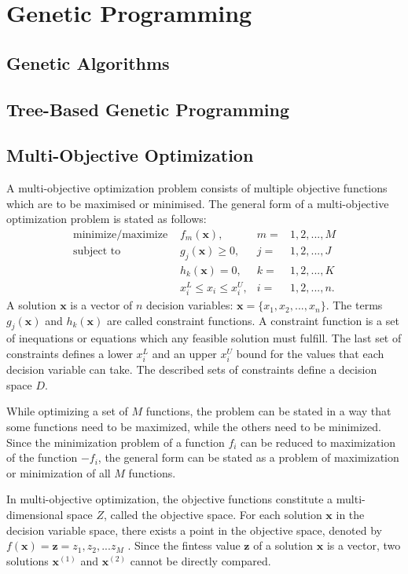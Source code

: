 \chapter{Genetic Programming}
\section{Genetic Algorithms}
\section{Tree-Based Genetic Programming}

\section{Multi-Objective Optimization}
A multi-objective optimization problem consists of multiple objective functions which are to be maximised or minimised. 
The general form of a multi-objective optimization problem is stated as follows:
\begin{align*}
\text{minimize/maximize } & f_m(\textbf{x}),  & m = & 1, 2, ..., M \\
\text{subject to } & g_j(\textbf{x}) \geq 0, & j = & 1, 2, ..., J \\
           & h_k(\textbf{x}) = 0, & k = & 1, 2, ..., K \\
           & x_{i}^{L} \leq x_i \leq x_{i}^{U}, & i = & 1, 2, ..., n. 
\end{align*}
A solution $\textbf{x}$ is a vector of $n$ decision variables: $\textbf{x} = \{x_1,x_2,...,x_n\}$.
The terms $g_j(\textbf{x})$ and $h_k(\textbf{x})$ are called constraint functions. 
A constraint function is a set of inequations or equations which any feasible solution must fulfill. 
The last set of constraints defines a lower $x_{i}^{L}$ and an upper $x_{i}^{U}$ bound for the values that each decision variable can take. 
The described sets of constraints define a decision space $D$.

While optimizing a set of $M$ functions, the problem can be stated in a way that some functions need to be maximized, while the others need to be minimized. 
Since the minimization problem of a function $f_i$ can be reduced to maximization of the function $-f_i$, the general form can be stated as a problem of maximization or minimization of all $M$ functions.

In multi-objective optimization, the objective functions constitute a multi-dimensional space $Z$, called the objective space. 
For each solution $\textbf{x}$ in the decision variable space, there exists a point in the objective space, denoted by $f(\textbf{x}) = \textbf{z} = {z_1, z_2, ... z_M}$ 
\cite{deb2001multi}. 
Since the fintess value $\textbf{z}$ of a solution $\textbf{x}$ is a vector, two solutions 
$\textbf{x}^{(1)}$ and $\textbf{x}^{(2)}$ cannot be directly compared. 

